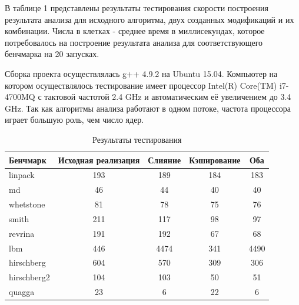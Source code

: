 \Conc

В таблице 1 представлены результаты тестирования скорости построения результата анализа для исходного алгоритма, двух созданных модификаций и их комбинации. Числа в клетках - среднее время в миллисекундах, которое потребовалось на построение результата анализа для соответствующего бенчмарка на 20 запусках.

Сборка проекта осуществлялась g++ 4.9.2 на Ubuntu 15.04. Компьютер на котором осуществлялось тестирование имеет процессор Intel(R) Core(TM) i7-4700MQ с тактовой частотой 2.4 GHz и автоматическим её увеличением до 3.4 GHz. Так как алгоритмы анализа работают в одном потоке, частота процессора играет большую роль, чем число ядер.

\begin{table}[h!]
\label{tabl:Profiling}
\begin{tabular}{l | c | c | c | c }
Бенчмарк & Исходная реализация & Слияние & Кэширование & Оба \\
\hline \hline
linpack & 193 & 189 & 184 & 183 \\
md & 46 & 44 & 40 & 40\\ 
whetstone & 81 & 78 & 75 & 76\\
smith & 211 & 117 & 98 & 97\\
revrina & 191 & 192 & 67 & 68\\
lbm & 446 & 4474 & 341 & 4490\\
hirschberg & 604 & 570 & 309 & 306\\
hirschberg2 & 104 & 103 & 50 & 51\\
quagga & 23 & 6 & 22 & 6
\end{tabular}
\caption{Результаты тестирования}
\end{table}

\newpage %

\printbibliography[
    heading=bibintoc%
    ,title=Библиография %
]


